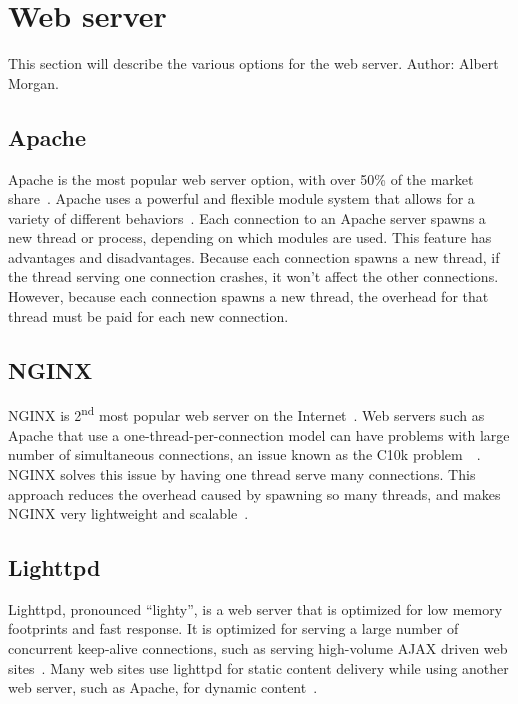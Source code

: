 \documentclass[10pt,draftclsnofoot,onecolumn]{IEEEtran}
\begin{document}
	\section{Web server}
	This section will describe the various options for the web server. Author: Albert Morgan.

	\subsection{Apache}
	Apache is the most popular web server option, with over 50\% of the market share~\cite{apache-usage-statistics}.
	Apache uses a powerful and flexible module system that allows for a variety of different behaviors~\cite{apache-vs-nginx-practical-considerations}.
	Each connection to an Apache server spawns a new thread or process, depending on which modules are used.
	This feature has advantages and disadvantages.
	Because each connection spawns a new thread, if the thread serving one connection crashes, it won't affect the other connections.
	However, because each connection spawns a new thread, the overhead for that thread must be paid for each new connection.

	\subsection{NGINX}
	NGINX is 2\textsuperscript{nd} most popular web server on the Internet~\cite{nginx-usage-statistics}.
	Web servers such as Apache that use a one-thread-per-connection model can have problems with large number of simultaneous connections, an issue known as the C10k problem~\cite{apache-vs-nginx-practical-considerations}~\cite{c10k-problem}.
	NGINX solves this issue by having one thread serve many connections.
	This approach reduces the overhead caused by spawning so many threads, and makes NGINX very lightweight and scalable~\cite{nginx-vs-apache-our-view}.
	
	\subsection{Lighttpd}
	Lighttpd, pronounced ``lighty'', is a web server that is optimized for low memory footprints and fast response.
	It is optimized for serving a large number of concurrent keep-alive connections, such as serving high-volume AJAX driven web sites~\cite{lighttpd}. Many web sites use lighttpd for static content delivery while using another web server, such as Apache,
	for dynamic content~\cite{powered-by-lighttpd}.
\end{document}
